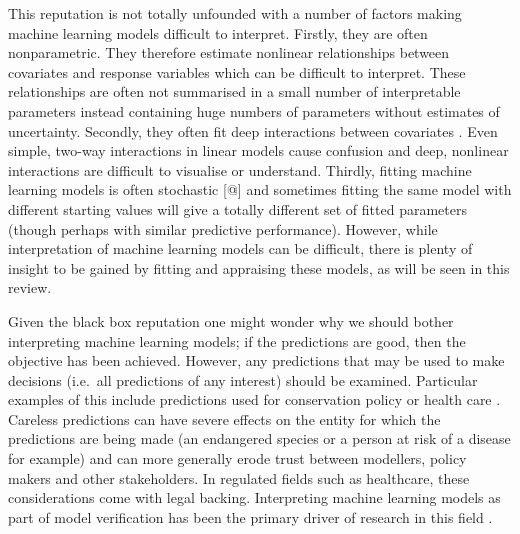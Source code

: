 \documentclass[10pt,]{article}
\begin{document}
This reputation is not totally unfounded with a number of factors making machine learning models difficult to interpret. Firstly, they are often nonparametric. They therefore estimate nonlinear relationships between covariates and response variables which can be difficult to interpret. These relationships are often not summarised in a small number of interpretable parameters instead containing huge numbers of parameters without estimates of uncertainty. Secondly, they often fit deep interactions between covariates \citep{lunetta2004screening}. Even simple, two-way interactions in linear models cause confusion \citep{engqvist2005mistreatment, lamina2012visualizing} and deep, nonlinear interactions are difficult to visualise or understand. Thirdly, fitting machine learning models is often stochastic {[}@{]} and sometimes fitting the same model with different starting values will give a totally different set of fitted parameters (though perhaps with similar predictive performance). However, while interpretation of machine learning models can be difficult, there is plenty of insight to be gained by fitting and appraising these models, as will be seen in this review.

Given the black box reputation one might wonder why we should bother interpreting machine learning models; if the predictions are good, then the objective has been achieved. However, any predictions that may be used to make decisions (i.e.~all predictions of any interest) should be examined. Particular examples of this include predictions used for conservation policy or health care \citep{vayena2018machine}. Careless predictions can have severe effects on the entity for which the predictions are being made (an endangered species or a person at risk of a disease for example) and can more generally erode trust between modellers, policy makers and other stakeholders. In regulated fields such as healthcare, these considerations come with legal backing. Interpreting machine learning models as part of model verification has been the primary driver of research in this field \citep{molnar, ribeiro2016should}.
\end{document}
